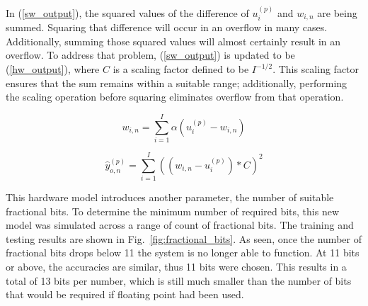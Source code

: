 \documentclass[10pt,journal]{IEEEtran}
\newcommand{\fig}[1]{Fig.~\ref{#1}}
\newcommand{\eq}[1]{(\ref{#1})}
\begin{document}
				In \eq{sw_output}, the squared values of the difference of \(u_i^{(p)}\) and \(w_{i,n}\) are being summed. Squaring that difference will occur in an overflow in many cases. Additionally, summing those squared values will almost certainly result in an overflow. To address that problem, \eq{sw_output} is updated to be \eq{hw_output}, where \(C\) is a scaling factor defined to be \(I^{-1/2}\). This scaling factor ensures that the sum remains within a suitable range; additionally, performing the scaling operation before squaring eliminates overflow from that operation.
				
				\begin{equation}
					\label{hw_weight_update}
					w_{i,n} = \displaystyle\sum_{i=1}^{I}\alpha(u_i^{(p)}-w_{i,n})
				\end{equation}
				
				\begin{equation}
					\label{hw_output}
					\hat{y}_{o,n}^{(p)} = \displaystyle\sum_{i=1}^{I}((w_{i,n} - u_i^{(p)})*C)^2
				\end{equation}
				
				This hardware model introduces another parameter, the number of suitable fractional bits. To determine the minimum number of required bits, this new model was simulated across a range of count of fractional bits. The training and testing results are shown in \fig{fig:fractional_bits}. As seen, once the number of fractional bits drops below 11 the system is no longer able to function. At 11 bits or above, the accuracies are similar, thus 11 bits were chosen. This results in a total of 13 bits per number, which is still much smaller than the number of bits that would be required if floating point had been used.
				
\end{document}
